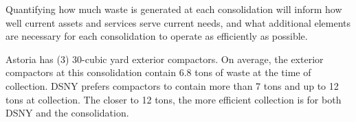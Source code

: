
    Quantifying how much waste is generated at each consolidation will inform how well current assets and services serve current needs, and what additional elements are necessary for each consolidation to operate as efficiently as possible.
    
    Astoria has (3) 30-cubic yard exterior compactors. On average, the exterior compactors at this consolidation contain 6.8 tons of waste at the time of collection. DSNY prefers compactors to contain more than 7 tons and up to 12 tons at collection. The closer to 12 tons, the more efficient collection is for both DSNY and the consolidation.